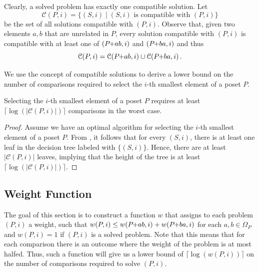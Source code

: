 \documentclass[a4paper,UKenglish,cleveref, autoref, thm-restate]{lipics-v2021}
\newcommand{\pchild}[3]{{#1}\kern-1pt{+}{#2}{#3}}
\begin{document}
Clearly, a solved problem has exactly one compatible solution.
Let
\begin{equation*}
  \mathcal{C}(P, i) = \{(S, i) \mid (S, i) \text{ is compatible with } (P, i)\}
\end{equation*}
be the set of all solutions compatible with $(P, i)$.
Observe that, given two elements $a,b$ that are unrelated in $P$, every solution compatible with $(P, i)$ is compatible with at least one of $(\pchild{P}{a}{b}, i)$ and $(\pchild{P}{b}{a}, i)$ and thus
\begin{equation}\label{lemma:compatible_union}
  \mathcal{C}(P, i) = \mathcal{C}(\pchild{P}{a}{b}, i) \cup \mathcal{C}(\pchild{P}{b}{a}, i)\,\text{.}
\end{equation}

We use the concept of compatible solutions to derive a lower bound on the number of comparisons required to select the $i$-th smallest element of a poset $P$.

\begin{theorem}\label{theorem:compatible_log}
  Selecting the $i$-th smallest element of a poset $P$ requires at least $\lceil\log(|\mathcal{C}(P, i)|)\rceil$ comparisons in the worst case.
\end{theorem}

\begin{proof}
  Assume we have an optimal algorithm for selecting the $i$-th smallest element of a poset $P$.
  From , it follows that for every $(S, i)$, there is at least one leaf in the decision tree labeled with $\{(S, i)\}$.
  Hence, there are at least $|\mathcal{C}(P, i)|$ leaves, implying that the height of the tree is at least $\lceil\log(|\mathcal{C}(P, i)|)\rceil$.
\end{proof}


\subsection{Weight Function}

The goal of this section is to construct a function $w$ that assigns to each problem $(P, i)$ a weight, such that $w(P,i) \le w(\pchild{P}{a}{b}, i) + w(\pchild{P}{b}{a},i)$ for each $a,b \in \Omega_P$ and $w(P,i) = 1$ if $(P, i)$ is a solved problem.
Note that this means that for each comparison there is an outcome where the weight of the problem is at most halfed.
Thus, such a function will give us a lower bound of $\lceil\log(w(P, i))\rceil$ on the number of comparisons required to solve $(P, i)$.
\end{document}
